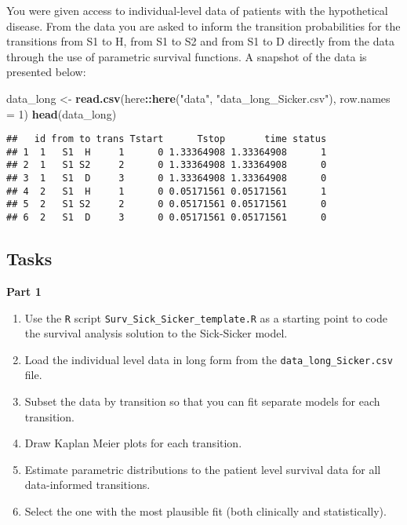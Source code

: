 \documentclass[
]{article}
\newenvironment{Shaded}{\begin{snugshade}}{\end{snugshade}}
\newcommand{\DataTypeTok}[1]{\textcolor[rgb]{0.13,0.29,0.53}{#1}}
\newcommand{\DecValTok}[1]{\textcolor[rgb]{0.00,0.00,0.81}{#1}}
\newcommand{\KeywordTok}[1]{\textcolor[rgb]{0.13,0.29,0.53}{\textbf{#1}}}
\newcommand{\NormalTok}[1]{#1}
\newcommand{\OperatorTok}[1]{\textcolor[rgb]{0.81,0.36,0.00}{\textbf{#1}}}
\newcommand{\StringTok}[1]{\textcolor[rgb]{0.31,0.60,0.02}{#1}}
\begin{document}
You were given access to individual-level data of patients with the
hypothetical disease. From the data you are asked to inform the
transition probabilities for the transitions from S1 to H, from S1 to S2
and from S1 to D directly from the data through the use of parametric
survival functions. A snapshot of the data is presented below:

\begin{Shaded}
\begin{Highlighting}[]
\NormalTok{data_long <-}\StringTok{ }\KeywordTok{read.csv}\NormalTok{(here}\OperatorTok{::}\KeywordTok{here}\NormalTok{(}\StringTok{"data"}\NormalTok{, }\StringTok{"data_long_Sicker.csv"}\NormalTok{), }\DataTypeTok{row.names =} \DecValTok{1}\NormalTok{)}
\KeywordTok{head}\NormalTok{(data_long)}
\end{Highlighting}
\end{Shaded}

\begin{verbatim}
##   id from to trans Tstart      Tstop       time status
## 1  1   S1  H     1      0 1.33364908 1.33364908      1
## 2  1   S1 S2     2      0 1.33364908 1.33364908      0
## 3  1   S1  D     3      0 1.33364908 1.33364908      0
## 4  2   S1  H     1      0 0.05171561 0.05171561      1
## 5  2   S1 S2     2      0 0.05171561 0.05171561      0
## 6  2   S1  D     3      0 0.05171561 0.05171561      0
\end{verbatim}

\hypertarget{tasks}{%
\subsection{Tasks}\label{tasks}}

\textbf{Part 1}

\begin{enumerate}
\def\labelenumi{\arabic{enumi}.}
\item
  Use the \texttt{R} script \texttt{Surv\_Sick\_Sicker\_template.R} as a
  starting point to code the survival analysis solution to the
  Sick-Sicker model.
\item
  Load the individual level data in long form from the
  \texttt{data\_long\_Sicker.csv} file.
\item
  Subset the data by transition so that you can fit separate models for
  each transition.
\item
  Draw Kaplan Meier plots for each transition.
\item
  Estimate parametric distributions to the patient level survival data
  for all data-informed transitions.
\item
  Select the one with the most plausible fit (both clinically and
  statistically).
\end{enumerate}
\end{document}
